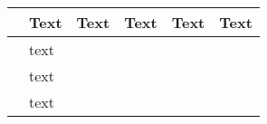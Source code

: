 \documentclass{article}
\begin{document}




\begin{table}
	\centering
	\begin{tabular}{|c|l|r|r|r|r|}
		\hline
		                                                & Text & Text & Text & Text & Text \\
		\hline
		\multirow{3}{*}{\rotatebox[origin=c]{0}{rota}} & text &      &      &      &      \\
		                                                & text &      &      &      &      \\
		                                                & text &      &      &      &      \\
		\hline
	\end{tabular}
\end{table}
\end{document}
